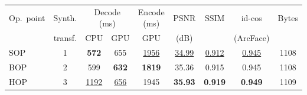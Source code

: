 \begin{tabular}{l c c c c c c c c}
\toprule
Op.\ point & Synth. & \multicolumn{2}{c}{Decode (ms)} & Encode (ms) & PSNR & SSIM & id-cos & Bytes \\
\cmidrule(lr){3-4}
 & transf. & CPU & GPU & GPU & (dB) & & (ArcFace) & \\
\midrule
SOP & 1 & \cellcolor{green!25}\textbf{572} & 655 & \cellcolor{red!22}\underline{1956} & \cellcolor{red!22}\underline{34.99} & \cellcolor{red!22}\underline{0.912} & \cellcolor{red!22}\underline{0.945} & 1108 \\
BOP & 2 & 599 & \cellcolor{green!25}\textbf{632} & \cellcolor{green!25}\textbf{1819} & 35.36 & 0.915 & 0.945 & 1108 \\
HOP & 3 & \cellcolor{red!22}\underline{1192} & \cellcolor{red!22}\underline{656} & 1945 & \cellcolor{green!25}\textbf{35.93} & \cellcolor{green!25}\textbf{0.919} & \cellcolor{green!25}\textbf{0.949} & 1109 \\
\bottomrule
\end{tabular}
